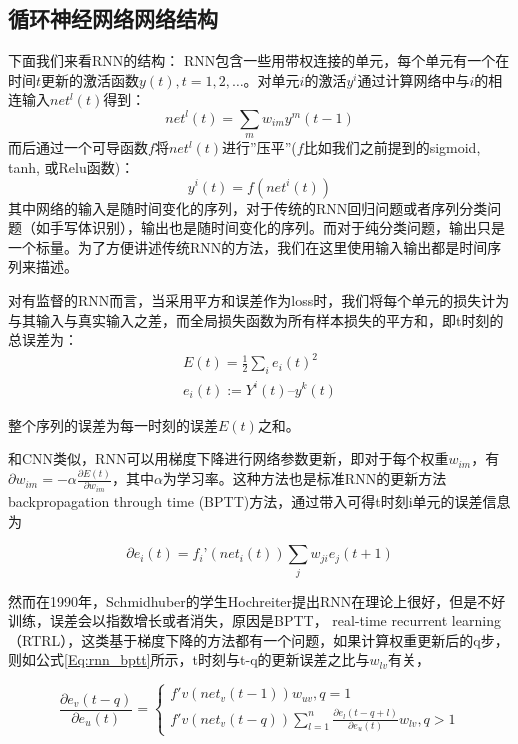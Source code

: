 \subsection{循环神经网络网络结构}

下面我们来看RNN的结构：
RNN包含一些用带权连接的单元，每个单元有一个在时间$t$更新的激活函数$y(t), t=1,2,…$。对单元$i$的激活$y^{i}$通过计算网络中与$i$的相连输入$net^{l}(t)$得到：
\begin{equation}
	net^{l}(t) = \sum_m{w_{im}y^m(t-1)}
\end{equation}
而后通过一个可导函数$f$将$net^{l}(t)$进行”压平”($f$比如我们之前提到的sigmoid, tanh, 或Relu函数)：
\begin{equation}
	y^{i}(t) = f(net^i(t))
\end{equation}
其中网络的输入是随时间变化的序列，对于传统的RNN回归问题或者序列分类问题（如手写体识别），输出也是随时间变化的序列。而对于纯分类问题，输出只是一个标量。为了方便讲述传统RNN的方法，我们在这里使用输入输出都是时间序列来描述。

对有监督的RNN而言，当采用平方和误差作为loss时，我们将每个单元的损失计为与其输入与真实输入之差，而全局损失函数为所有样本损失的平方和，即t时刻的总误差为：
\begin{equation}
 \begin{array}{lr}
E(t) = \frac{1}{2}\sum_i{{e_i(t)}^2}\\
e_i(t) := Y^i(t) –y^k(t)
 \end{array}
\end{equation}

整个序列的误差为每一时刻的误差$E(t)$之和。


和CNN类似，RNN可以用梯度下降进行网络参数更新，即对于每个权重$w_{im}$，有
$\partial w_{im} = -\alpha \frac{\partial E(t)}{\partial w_{im}}$，其中$\alpha$为学习率。这种方法也是标准RNN的更新方法backpropagation through time (BPTT)方法，通过带入可得t时刻i单元的误差信息为

\begin{equation}
\partial e_i(t) = f_i’(net_i(t))\sum_j{w_{ji}e_j(t+1)}
\end{equation}

然而在1990年，Schmidhuber的学生Hochreiter提出RNN在理论上很好，但是不好训练，误差会以指数增长或者消失\cite{williams1995gradient}，原因是BPTT， real-time recurrent learning（RTRL）\cite{williams1989learning}，这类基于梯度下降的方法都有一个问题，如果计算权重更新后的q步，则如公式\ref{Eq:rnn_bptt}所示，t时刻与t-q的更新误差之比与$w_{lv}$有关，

\begin{equation}\label{Eq:rnn_bptt}
	\frac{\partial e_v(t-q)}{\partial e_u(t)} = 
	\left\{
	\begin{array}{lr}
		f'v(net_v(t-1))w_{uv}, q=1\\
		f'v(net_v(t-q))\sum_{l=1}^n{\frac{\partial e_l(t-q+l)}{\partial e_u(t)}w_{lv}}, q>1
	\end{array}
	\right.
\end{equation}

